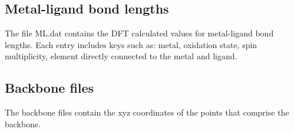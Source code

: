 \documentclass[a4paper,12pt]{assignment}
\begin{document}
\subsection{Metal-ligand bond lengths}
The file ML.dat contains the DFT calculated values for metal-ligand bond lengths. Each entry includes keys such as: metal, oxidation state, spin multiplicity, element directly connected to the metal and ligand. 
\subsection{Backbone files}
The backbone files contain the xyz coordinates of the points that comprise the backbone.
\end{document}
